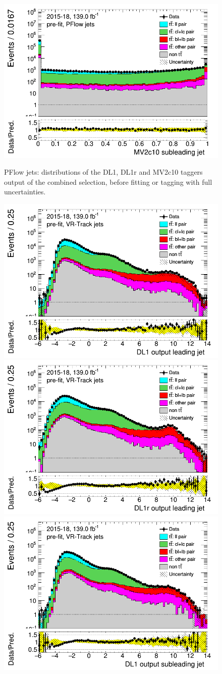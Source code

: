 \documentclass[letterpaper,12pt]{article}
\begin{document}
\begin{figure}[H]
	\includegraphics[width=.45\textwidth]{FTAG_plots/pretagNoRwwithhighpTPFlowall/DataMC_h_J1_MV2c10_log.png}\\
	\caption{PFlow jets: distributions of the DL1, DL1r and MV2c10 
	taggers output of the combined selection, 
	before fitting or tagging with full uncertainties.} \label{fig:taggers_PFlow}
\end{figure}
\newpage
\begin{figure}[H]
	\includegraphics[width=.45\textwidth]{FTAG_plots/pretagNoRwwithhighpTVRJetsall/DataMC_h_J0_DL1trackjet_log.png}
	\includegraphics[width=.45\textwidth]{FTAG_plots/pretagNoRwwithhighpTVRJetsall/DataMC_h_J0_DL1rtrackjet_log.png}\\
	\includegraphics[width=.45\textwidth]{FTAG_plots/pretagNoRwwithhighpTVRJetsall/DataMC_h_J1_DL1trackjet_log.png}

\end{figure}
\end{document}

